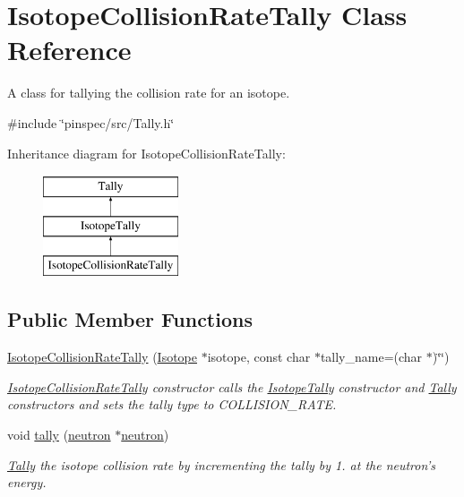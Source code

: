 \hypertarget{classIsotopeCollisionRateTally}{\section{Isotope\-Collision\-Rate\-Tally Class Reference}
\label{classIsotopeCollisionRateTally}
}


A class for tallying the collision rate for an isotope.  




{\ttfamily \#include \char`\"{}pinspec/src/\-Tally.\-h\char`\"{}}

Inheritance diagram for Isotope\-Collision\-Rate\-Tally\-:\begin{figure}[H]
\begin{center}
\leavevmode
\includegraphics[height=3.000000cm]{classIsotopeCollisionRateTally}
\end{center}
\end{figure}
\subsection*{Public Member Functions}
\begin{DoxyCompactItemize}
\item 
\hyperlink{classIsotopeCollisionRateTally_a4225e720b64ea57595b1295cda742198}{Isotope\-Collision\-Rate\-Tally} (\hyperlink{classIsotope}{Isotope} $\ast$isotope, const char $\ast$tally\-\_\-name=(char $\ast$)\char`\"{}\char`\"{})
\begin{DoxyCompactList}\small\item\em \hyperlink{classIsotopeCollisionRateTally}{Isotope\-Collision\-Rate\-Tally} constructor calls the \hyperlink{classIsotopeTally}{Isotope\-Tally} constructor and \hyperlink{classTally}{Tally} constructors and sets the tally type to C\-O\-L\-L\-I\-S\-I\-O\-N\-\_\-\-R\-A\-T\-E. \end{DoxyCompactList}\item 
void \hyperlink{classIsotopeCollisionRateTally_acd866aa174db9df4b5bdba6347735886}{tally} (\hyperlink{structneutron}{neutron} $\ast$\hyperlink{structneutron}{neutron})
\begin{DoxyCompactList}\small\item\em \hyperlink{classTally}{Tally} the isotope collision rate by incrementing the tally by 1. at the neutron's energy. \end{DoxyCompactList}\end{DoxyCompactItemize}
